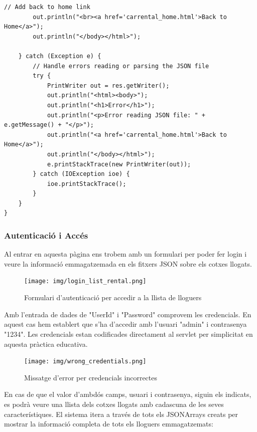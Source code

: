 \documentclass[12pt,a4paper]{article}
\begin{document}
\begin{lstlisting}[style=javastyle,caption=Funció handleReadRental per mostrar lloguers]
        // Add back to home link
        out.println("<br><a href='carrental_home.html'>Back to Home</a>");
        out.println("</body></html>");

    } catch (Exception e) {
        // Handle errors reading or parsing the JSON file
        try {
            PrintWriter out = res.getWriter();
            out.println("<html><body>");
            out.println("<h1>Error</h1>");
            out.println("<p>Error reading JSON file: " + e.getMessage() + "</p>");
            out.println("<a href='carrental_home.html'>Back to Home</a>");
            out.println("</body></html>");
            e.printStackTrace(new PrintWriter(out));
        } catch (IOException ioe) {
            ioe.printStackTrace();
        }
    }
}
\end{lstlisting}

\subsubsection{Autenticació i Accés}

Al entrar en aquesta pàgina ens trobem amb un formulari per poder fer login i veure la informació emmagatzemada en els fitxers JSON sobre els cotxes llogats.

\begin{figure}[H]
\centering
\texttt{[image: img/login\_list\_rental.png]}
\caption{Formulari d'autenticació per accedir a la llista de lloguers}
\end{figure}

Amb l'entrada de dades de "UserId" i "Password" comprovem les credencials. En aquest cas hem establert que s'ha d'accedir amb l'usuari "admin" i contrasenya "1234". Les credencials estan codificades directament al servlet per simplicitat en aquesta pràctica educativa.

\begin{figure}[H]
\centering
\texttt{[image: img/wrong\_credentials.png]}
\caption{Missatge d'error per credencials incorrectes}
\end{figure}

En cas de que el valor d'ambdós camps, usuari i contrasenya, siguin els indicats, es podrà veure una llista dels cotxes llogats amb cadascuna de les seves característiques. El sistema itera a través de tots els JSONArrays creats per mostrar la informació completa de tots els lloguers emmagatzemats:
\end{document}

